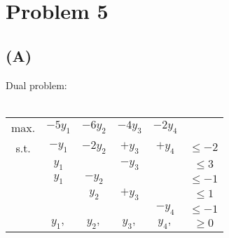 \documentclass[12pt]{article}
\begin{document}
\newpage
\section*{Problem 5}
\subsection*{(A)}
Dual problem: \\
\\
\begin{tabular}{c c c c c c}
    max. & $-5y_1$ & $-6y_2$ & $-4y_3$ & $-2y_4$ \\
    s.t. & $-y_1$ & $-2y_2$ & $+y_3$ & $+y_4$ & $\leq -2$ \\
    & $y_1$ & & $-y_3$ & & $\leq 3$ \\
    & $y_1$ & $-y_2$ & & & $\leq -1$ \\
    & & $y_2$ & $+y_3$ & & $\leq 1$ \\
    & & & & $-y_4$ & $\leq -1$ \\
    & $y_1,$ & $y_2,$ & $y_3,$ & $y_4,$ & $\geq 0$
\end{tabular}
\end{document}
